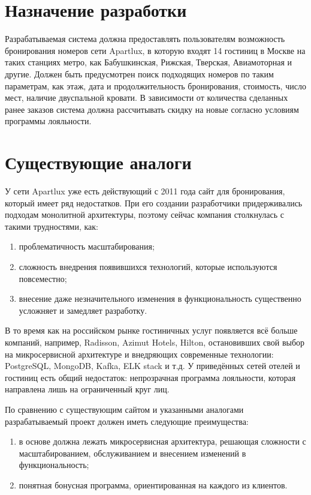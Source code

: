 \section*{Назначение разработки}
Разрабатываемая система должна предоставлять пользователям возможность бронирования номеров сети Apartlux, в которую входят 14 гостиниц в Москве на таких станциях метро, как Бабушкинская, Рижская, Тверская, Авиамоторная и другие. Должен быть предусмотрен поиск подходящих номеров по таким параметрам, как этаж, дата и продолжительность бронирования, стоимость, число мест, наличие двуспальной кровати. В зависимости от количества сделанных ранее заказов система должна рассчитывать скидку на новые согласно условиям программы лояльности.

\section*{Существующие аналоги}
У сети Apartlux уже есть действующий с 2011 года сайт для бронирования, который имеет ряд недостатков. При его создании разработчики придерживались подходам монолитной архитектуры, поэтому сейчас компания столкнулась с такими трудностями, как:
\begin{enumerate}
	\item проблематичность масштабирования;
	
	\item сложность внедрения появившихся технологий, которые используются повсеместно;
	
	\item внесение даже незначительного изменения в функциональность существенно усложняет и замедляет разработку.
\end{enumerate}

В то время как на российском рынке гостиничных услуг появляется всё больше компаний, например, Radisson, Azimut Hotels, Hilton, остановивших свой выбор на микросервисной архитектуре и внедряющих современные технологии: PostgreSQL, MongoDB, Kafka, ELK stack и т.д. У приведённых сетей отелей и гостиниц есть общий недостаток: непрозрачная программа лояльности, которая направлена лишь на ограниченный круг лиц.

По сравнению с существующим сайтом и указанными аналогами разрабатываемый проект должен иметь следующие преимущества:
\begin{enumerate}
	\item в основе должна лежать микросервисная архитектура, решающая сложности с масштабированием, обслуживанием и внесением изменений в функциональность;
	
	\item понятная бонусная программа, ориентированная на каждого из клиентов.
\end{enumerate}


